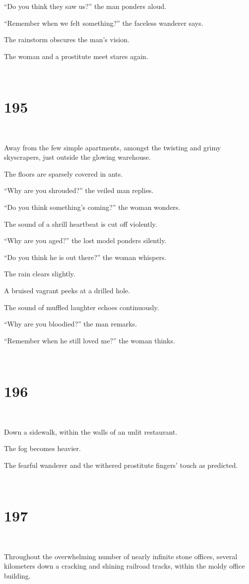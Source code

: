 \documentclass{report}
\begin{document}
``Do you think they saw us?'' the man ponders aloud.

``Remember when we felt something?'' the faceless wanderer says.

The rainstorm obscures the man's vision.

The woman and a prostitute meet stares again.

~
\chapter*{195}
~

Away from the few simple apartments, amongst the twisting and grimy skyscrapers, just outside the glowing warehouse.

The floors are sparsely covered in ants.

``Why are you shrouded?'' the veiled man replies.

``Do you think something's coming?'' the woman wonders.

The sound of a shrill heartbeat is cut off violently.

``Why are you aged?'' the lost model ponders silently.

``Do you think he is out there?'' the woman whispers.

The rain clears slightly.

A bruised vagrant peeks at a drilled hole.

The sound of muffled laughter echoes continuously.

``Why are you bloodied?'' the man remarks.

``Remember when he still loved me?'' the woman thinks.

~
\chapter*{196}
~

Down a sidewalk, within the walls of an unlit restaurant.

The fog becomes heavier.

The fearful wanderer and the withered prostitute fingers' touch as predicted.

~
\chapter*{197}
~

Throughout the overwhelming number of nearly infinite stone offices, several kilometers down a cracking and shining railroad tracks, within the moldy office building.
\end{document}
